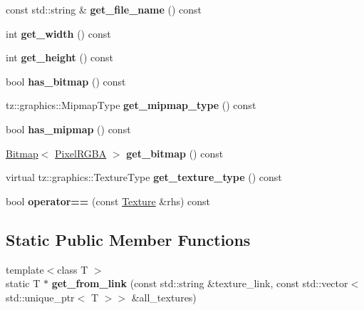 \begin{DoxyCompactItemize}
\item 
\mbox{\label{class_texture_a1997024a190c49b1a9405788aa79fdcd}} 
const std\+::string \& {\bfseries get\+\_\+file\+\_\+name} () const
\item 
\mbox{\label{class_texture_a0855aaa1c0252620681351b1cf8f2244}} 
int {\bfseries get\+\_\+width} () const
\item 
\mbox{\label{class_texture_a04e93b660b6588087569275641417d51}} 
int {\bfseries get\+\_\+height} () const
\item 
\mbox{\label{class_texture_a7d569e6b184fb98307a97086d0ab74b8}} 
bool {\bfseries has\+\_\+bitmap} () const
\item 
\mbox{\label{class_texture_ab33e71e57ac4fd800e3f171854748dad}} 
tz\+::graphics\+::\+Mipmap\+Type {\bfseries get\+\_\+mipmap\+\_\+type} () const
\item 
\mbox{\label{class_texture_a8c93ccbbcf6c1c4710e89f8eb45ce500}} 
bool {\bfseries has\+\_\+mipmap} () const
\item 
\mbox{\label{class_texture_aa5ee6e7456b6d68918f6814eef76f7ac}} 
\mbox{\hyperlink{class_bitmap}{Bitmap}}$<$ \mbox{\hyperlink{class_pixel_r_g_b_a}{Pixel\+R\+G\+BA}} $>$ {\bfseries get\+\_\+bitmap} () const
\item 
\mbox{\label{class_texture_a1f0034e4e96f51539165bfc861d5c7c9}} 
virtual tz\+::graphics\+::\+Texture\+Type {\bfseries get\+\_\+texture\+\_\+type} () const
\item 
\mbox{\label{class_texture_a8a8184cc15e59a78e64131773f1da839}} 
bool {\bfseries operator==} (const \mbox{\hyperlink{class_texture}{Texture}} \&rhs) const
\end{DoxyCompactItemize}
\subsection*{Static Public Member Functions}
\begin{DoxyCompactItemize}
\item 
\mbox{\label{class_texture_a3b2d270058efab162df59cdfacd0c0c4}} 
{\footnotesize template$<$class T $>$ }\\static T $\ast$ {\bfseries get\+\_\+from\+\_\+link} (const std\+::string \&texture\+\_\+link, const std\+::vector$<$ std\+::unique\+\_\+ptr$<$ T $>$$>$ \&all\+\_\+textures)
\end{DoxyCompactItemize}
